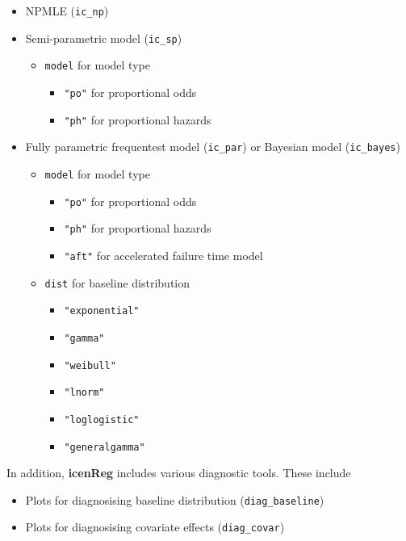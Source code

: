 \documentclass[a4paper]{article}
\begin{document}
  \begin{itemize}
  
    \item NPMLE (\texttt{ic\_np})
  
    \item Semi-parametric model (\texttt{ic\_sp})
        \begin{itemize}
        \item \texttt{model} for model type
          \begin{itemize}
          \item \texttt{"po"} for proportional odds
          \item \texttt{"ph"} for proportional hazards 
          \end{itemize}
        \end{itemize}
    \item Fully parametric frequentest model (\texttt{ic\_par}) or Bayesian model (\texttt{ic\_bayes})
      \begin{itemize}
        \item \texttt{model} for model type
          \begin{itemize}
          \item \texttt{"po"} for proportional odds
          \item \texttt{"ph"} for proportional hazards 
          \item \texttt{"aft"} for accelerated failure time model
          \end{itemize}

      \item \texttt{dist} for baseline distribution
        \begin{itemize}
        \item \texttt{"exponential"}
        \item \texttt{"gamma"} 
        \item \texttt{"weibull"}
        \item \texttt{"lnorm"}
        \item \texttt{"loglogistic"}
        \item \texttt{"generalgamma"}
        \end{itemize}
      \end{itemize}
  \end{itemize}
  
  In addition, {\bf{icenReg}} includes various diagnostic tools. These include
  
  \begin{itemize}
  
    \item Plots for diagnosising baseline distribution (\texttt{diag\_baseline})
    
    \item Plots for diagnosising covariate effects (\texttt{diag\_covar})
    

  \end{itemize}
  
\end{document}
